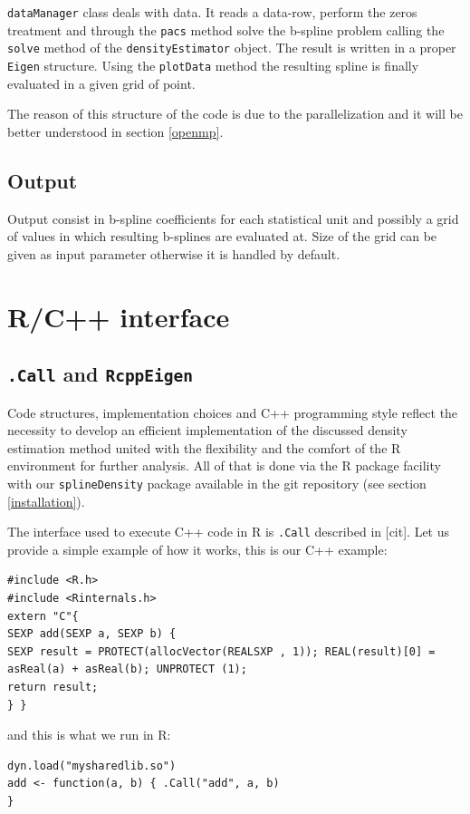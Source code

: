 \verb|dataManager| class deals with data. It reads a data-row, perform the zeros treatment and through the \verb|pacs| method solve the b-spline problem calling the \verb|solve| method of the \verb|densityEstimator| object. The result is written in a proper \verb|Eigen| structure. Using the \verb|plotData| method the resulting spline is finally evaluated in a given grid of point.

The reason of this structure of the code is due to the parallelization and it will be better understood in section \ref{openmp}.

\subsection{Output}
Output consist in b-spline coefficients for each statistical unit and possibly a grid of values in which resulting b-splines are evaluated at. Size of the grid can be given as input parameter otherwise it is handled by default.

\section{R/C++ interface} \label{R}
\subsection{\texttt{.Call} and \texttt{RcppEigen}}
Code structures, implementation choices and C++ programming style reflect the necessity to develop an efficient implementation of the discussed density estimation method united with the flexibility and the comfort of the R environment for further analysis. All of that is done via the R package facility with our \verb|splineDensity| package available in the git repository (see section \ref{installation}). 

The interface used to execute C++ code in R is \verb|.Call| described in [cit]. Let us provide a simple example of how it works, this is our C++ example:

\begin{lstlisting}
#include <R.h>
#include <Rinternals.h>
extern "C"{
SEXP add(SEXP a, SEXP b) {
SEXP result = PROTECT(allocVector(REALSXP , 1)); REAL(result)[0] = asReal(a) + asReal(b); UNPROTECT (1);
return result;
} }
\end{lstlisting}

and this is what we run in R:

\begin{lstlisting}
dyn.load("mysharedlib.so")
add <- function(a, b) { .Call("add", a, b)
}
\end{lstlisting}


